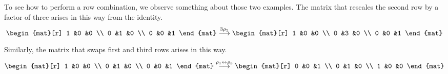 To see how to perform a row combination, 
we observe something about those two examples.
The matrix that rescales the second row by a factor of three arises in this 
way from the identity.
\begin{equation*}
    \begin{mat}[r]
      1  &0  &0  \\
      0  &1  &0  \\
      0  &0  &1
    \end{mat}
  \grstep{3\rho_2}
    \begin{mat}[r]
      1  &0  &0  \\
      0  &3  &0  \\
      0  &0  &1
    \end{mat}
\end{equation*}
Similarly, the matrix that swaps first and third rows arises in this way.
\begin{equation*}
    \begin{mat}[r]
      1  &0  &0  \\
      0  &1  &0  \\
      0  &0  &1
    \end{mat}
  \grstep{\rho_1\leftrightarrow\rho_3}
    \begin{mat}[r]
      0  &0  &1  \\
      0  &1  &0  \\
      1  &0  &0
    \end{mat}
\end{equation*}

